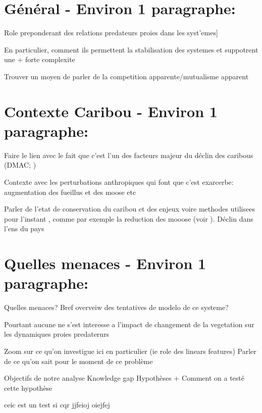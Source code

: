 
\section{Général - Environ 1 paragraphe:}
Role preponderant des relations predateurs proies dans les syst'emes]

En particulier, comment ils permettent la stabilisation des systemes et suppotrent une + forte complexite

Trouver un moyen de parler de la competition apparente/mutualisme apparent


\section{Contexte Caribou - Environ 1 paragraphe:}

Faire le lien avec le fait que c'est l'un des facteurs majeur du déclin des caribous (DMAC; \cite{neufeld2020})

Contexte avec les perturbations anthropiques qui font que c'est exarcerbe: augmentation des fueillus et des moose etc

Parler de l'etat de conservation du caribou et des enjeux voire methodes utilisees pour l'instant , comme par exemple la reduction des mooose (voir \cite{serrouya2019}). 
Déclin dans l'ens du pays



\section{Quelles menaces - Environ 1 paragraphe:}
Quelles menaces?
Bref overveiw des tentatives de modelo de ce systeme? \cite{serrouya2020}

Pourtant aucune ne s'est interesse a l'impact de changement de la vegetation sur les dynamiques proies predaterurs


Zoom sur ce qu'on investigue ici en particulier (ie role des linears features)
Parler de ce qu'on sait pour le moment de ce problème



Objectifs de notre analyse
Knowledge gap
Hypothèses + Comment on a testé cette hypothèse

ceic est un test si cqr jjfeioj oiejfej
